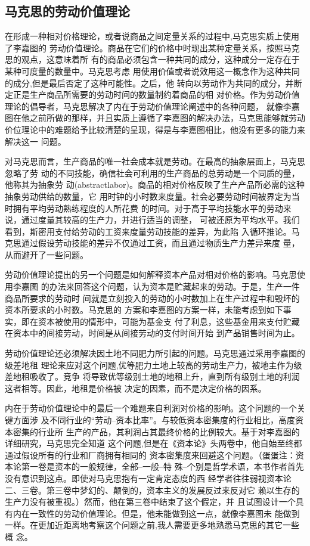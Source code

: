 \subsection{马克思的劳动价值理论}

在形成一种相对价格理论，或者说商品之间定量关系的过程中,马克思实质上使用了李嘉图的
劳动价值理论。商品在它们的价格中时现出某种定量关系，按照马克思的观点，这意味着所
有的商品必须包含一种共同的成分，这种成分一定存在于某种可度量的数量中。马克思考虑
用使用价值或者说效用这一概念作为这种共同的成分,但是最后否定了这种可能性。之后，他
转向以劳动作为共同的成分，并断定正是生产商品所需要的劳动时间的数量制约着商品的相
对价格。作为劳动价值理论的倡导者，马克思解决了内在于劳动价值理论阐述中的各种问题，
就像李嘉图在他之前所做的那样，并且实质上遵循了李嘉图的解决办法，马克思能够就劳动
价位理论中的难题给予比较清楚的呈现，得是与李嘉图相比，他没有更多的能力来解决这一
问题。

对马克思而言，生产商品的唯一社会成本就是劳动。在最高的抽象层面上，马克思忽略了劳
动的不同技能，确信社会可利用的生产商品的总劳动是一个同质的量，他称其为抽象劳
动(abstractlabor)。商品的相对价格反映了生产产品所必需的这种抽象劳动供给的数量，它
用时钟的小时数来度量。社会必要劳动时间被界定为当时拥有平均劳动熟练程度的人所花费
的时间。对于高于平均技能水平的劳动来说，通过度量其较高的生产力，并进行适当的调整，
可被还原为平均水平。我们看到，斯密用支付给劳动的工资来度量劳动技能的差异，为此陷
入循环推论。马克思通过假设劳动技能的差异不仅通过工资，而且通过物质生产力差异来度
量，从而避开了一些问题。

劳动价值理论提出的另一个问题是如何解释资本产品对相对价格的影响。马克思使用李嘉图
的办法来回答这个问题，认为资本是贮藏起来的劳动。于是，生产一件商品所要求的劳动时
间就是立刻投入的劳动的小时数加上在生产过程中和毁坏的资本所要求的小时数。马克思的
方案和李嘉图的方案一样，未能考虑到如下事实，即在资本被使用的情形中，可能为基金支
付了利息，这些基金用来支付贮藏在资本中的间接劳动，时间是从间接劳动的支付时间开始
到产品销售时间为止。

劳动价值理论还必须解决因土地不同肥力所引起的问题。马克思通过采用李嘉图的级差地租
理论来应对这个问题,优等肥力土地上较高的劳动生产力，被地主作为级差地租吸收了。竞争
将导致优等级别土地的地租上升，直到所有级别土地的利润这者相等。因此，地租是价格被
决定的因素，而不是决定价格的因系。

内在于劳动价值理论中的最后一个难题来自利润对价格的影响。这个问题的一个关键方面涉
及不同行业的“劳动--资本比率”。与较低资本密集度的行业相比，高度资本密集的行业所
生产的产品，其利润占其最终价格的比例较大。基于对李嘉图的详细研究，马克思完全知道
这个问题,但是在《资本论》头两卷中，他自始至终都通过假设所有的行业和厂商拥有相同的
资本密集度来回避这个问题。（蛋蛋注：资本论第一卷是资本的一般规律，全部--一般--特
殊--个别是哲学术语，本书作者首先没有意识到这点。即使对马克思抱有一定肯定态度的西
经学者往往弱视资本论二、三卷。第三卷中梦幻的、颠倒的，资本主义的发展反过来反对它
赖以生存的生产力没有被重视。）然而，他在第三卷中结束了这个假定，并
且试图设计一个具有内在一致性的劳动价值理论。但是，他未能做到这一点，就像李嘉图未
能做到一样。在更加近距离地考察这个问题之前,我人需要更多地熟悉马克思的其它一些概
念。

